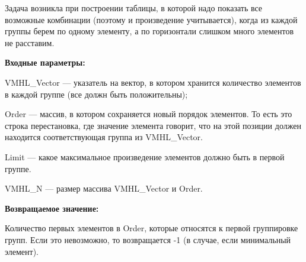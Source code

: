 Задача возникла при построении таблицы, в которой надо показать все возможные комбинации (поэтому и произведение учитывается), когда из каждой группы берем по одному элементу, а по горизонтали слишком много элементов не расставим.

\textbf{Входные параметры:}  
 
VMHL\_Vector --- указатель на вектор, в котором хранится количество элементов в каждой группе (все должн быть положительны);
 
Order --- массив, в котором сохраняется новый порядок элементов. То есть это строка перестановка, где значение элемента говорит, что на этой позиции должен находится соответствующая группа из VMHL\_Vector.
 
Limit --- какое максимальное произведение элементов должно быть в первой группе.
 
VMHL\_N --- размер массива VMHL\_Vector и Order.
 
\textbf{Возвращаемое значение:}

Количество первых элементов в Order, которые относятся к первой группировке групп. Если это невозможно, то возвращается -1 (в случае, если минимальный элемент).
